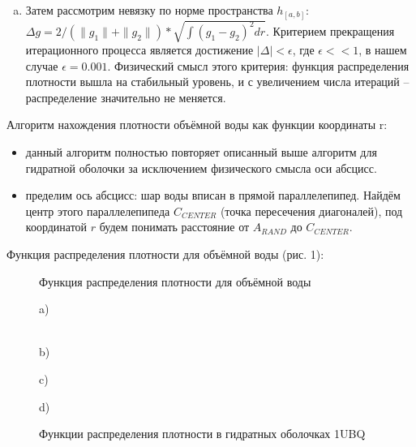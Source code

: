 \documentclass[a4paper]{article}
\begin{document}
\begin{enumerate}
\begin{enumerate}[(a)]
\item Затем рассмотрим невязку по норме пространства $h_{[a, b]}: $
$\Delta g = 2/(\| g_1 \| + \| g_2 \|) * \sqrt {\int (g_1-g_2)^2 dr} $. Критерием прекращения итерационного процесса является достижение $| \Delta | < \epsilon$, где 
$\epsilon << 1$, в нашем случае $\epsilon = 0.001$. Физический смысл этого критерия: функция распределения плотности вышла на стабильный уровень, и с увеличением числа итераций – распределение значительно не меняется.


\end{enumerate}

\end{enumerate}

Алгоритм нахождения плотности объёмной воды как функции координаты r:
\begin{itemize}
\item данный алгоритм полностью повторяет описанный выше алгоритм для гидратной оболочки за исключением физического смысла оси абсцисс. 
\item пределим ось абсцисс: шар воды вписан в прямой параллелепипед. Найдём центр этого параллелепипеда $C_{CENTER}$ (точка пересечения диагоналей), под координатой $r$ будем понимать расстояние от $A_{RAND}$ до $C_{CENTER}$.
\end{itemize}

Функция распределения плотности для объёмной воды (рис. 1):

\begin{figure}[h]
\caption{ Функция распределения плотности для объёмной воды}
\label{ris: water_density}
\end{figure}


\begin{figure}[H]
\begin{minipage}[h]{0.47\linewidth}
 a) \\
\end{minipage}
\hfill
\begin{minipage}[h]{0.47\linewidth}
 \\b)
\end{minipage}
\vfill
\begin{minipage}[h]{0.47\linewidth}
 c) \\
\end{minipage}
\hfill
\begin{minipage}[h]{0.47\linewidth}
 d) \\
\end{minipage}
\caption{ Функции распределения плотности в гидратных оболочках 1UBQ}
\label{ris: ubq_density}
\end{figure}
\end{document}
